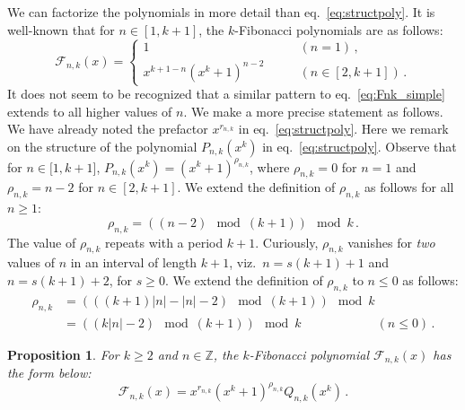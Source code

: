 \documentclass[review]{elsarticle}
\theoremstyle{plain}
\newtheorem{proposition}[theorem]{Proposition}
\begin{document}
We can factorize the polynomials in more detail than eq.~\eqref{eq:structpoly}.
It is well-known that for $n \in [1,k+1]$, the $k$-Fibonacci polynomials are as follows:
\begin{equation}
\label{eq:Fnk_simple}
\mathcal{F}_{n,k}(x) = \begin{cases} 1 & \qquad (n=1)\,, \\ x^{k+1-n}(x^k+1)^{n-2} &\qquad (n \in[2,k+1])\,. \end{cases}
\end{equation}
It does not seem to be recognized that a similar pattern
to eq.~\eqref{eq:Fnk_simple}
extends to all higher values of $n$.
We make a more precise statement as follows.
We have already noted the prefactor $x^{r_{n,k}}$ in eq.~\eqref{eq:structpoly}.
Here we remark on the structure of the polynomial $P_{n,k}(x^k)$ in eq.~\eqref{eq:structpoly}.
Observe that for $n\in[1,k+1$], $P_{n,k}(x^k)=(x^k+1)^{\rho_{n,k}}$, where $\rho_{n,k}=0$ for $n=1$ and $\rho_{n,k}=n-2$ for $n\in[2,k+1]$.
We extend the definition of $\rho_{n,k}$ as follows for all $n\ge1$:
\begin{equation}
\label{eq:rho_def_pos}
\rho_{n,k} = ((n-2)\!\!\!\mod(k+1))\!\!\!\mod k \,.
\end{equation}
The value of $\rho_{n,k}$ repeats with a period $k+1$.
Curiously, $\rho_{n,k}$ vanishes for \emph{two} values of $n$ in an interval of length $k+1$,
viz.~$n=s(k+1)+1$ and $n=s(k+1)+2$, for $s\ge0$.
We extend the definition of $\rho_{n,k}$ to $n\le0$ as follows:
\begin{equation}
\label{eq:rho_def_neg}
\begin{split}
\rho_{n,k} &= (((k+1)|n|-|n|-2)\!\!\!\mod(k+1))\!\!\!\mod k
\\
&= ((k|n|-2)\!\!\!\mod(k+1))\!\!\!\mod k \qquad\qquad\qquad (n\le0) \,.
\end{split}
\end{equation}
\begin{proposition}\label{prop:poly_extra_struct}
For $k\ge 2$ and $n\in\mathbb{Z}$, the $k$-Fibonacci polynomial $\mathcal{F}_{n,k}(x)$ has the form below:
\begin{equation}
\label{eq:Fnk_factor}
\mathcal{F}_{n,k}(x) = x^{r_{n,k}}(x^k+1)^{\rho_{n,k}}Q_{n,k}(x^k) \,.
\end{equation}
\end{proposition}
\end{document}
